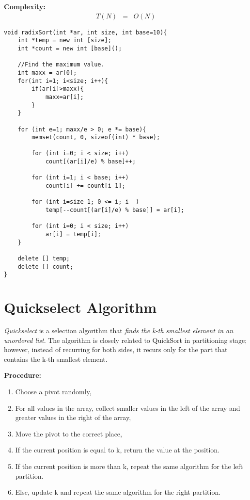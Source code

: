 \documentclass[12pt]{article}
\begin{document}
\textbf{Complexity: }
\begin{eqnarray*}
	T(N) &=& O(N)
\end{eqnarray*}

\begin{verbatim}
void radixSort(int *ar, int size, int base=10){
    int *temp = new int [size];
    int *count = new int [base]();

    //Find the maximum value.
    int maxx = ar[0];
    for(int i=1; i<size; i++){
        if(ar[i]>maxx){
            maxx=ar[i];
        }
    }
	
    for (int e=1; maxx/e > 0; e *= base){
        memset(count, 0, sizeof(int) * base);
		
        for (int i=0; i < size; i++)
            count[(ar[i]/e) % base]++;
		
        for (int i=1; i < base; i++)
            count[i] += count[i-1];
		
        for (int i=size-1; 0 <= i; i--)
            temp[--count[(ar[i]/e) % base]] = ar[i];
		
        for (int i=0; i < size; i++)
            ar[i] = temp[i];
    }
	
    delete [] temp;
    delete [] count;
}
\end{verbatim}


\cleardoublepage
    \section{Quickselect Algorithm}
	
	\textit{Quickselect} is a selection algorithm that \textit{finds the k-th smallest element in an unordered list}. The algorithm is closely related to QuickSort in partitioning stage; however, instead of recurring for both sides, it recurs only for the part that contains the k-th smallest element.

\textbf{Procedure: }
\begin{enumerate}
	\item Choose a pivot randomly,
	\item For all values in the array, collect smaller values in the left of the array and greater values in the right of the array,
	\item Move the pivot to the correct place,
	\item If the current position is equal to k, return the value at the position.
	\item If the current position is more than k, repeat the same algorithm for the left partition.
	\item Else, update k and repeat the same algorithm for the right partition.
\end{enumerate}	
\end{document}
